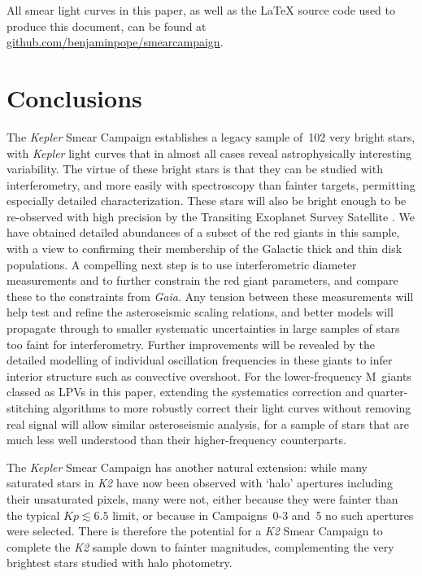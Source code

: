 \documentclass[a4paper,fleqn,usenatbib]{mnras}
\newcommand{\kepler}{\textit{Kepler}\xspace}
\newcommand{\ktwo}{\textit{K2}\xspace}
\newcommand{\gaia}{\textit{Gaia}\xspace}
\begin{document}
All smear light curves in this paper, as well as the \LaTeX{} source code used to produce this document, can be found
at \url{github.com/benjaminpope/smearcampaign}.


\section{Conclusions}
\label{conclusions}

The \kepler Smear Campaign establishes a legacy sample of~102 very bright stars, with \kepler light curves that in almost all cases reveal astrophysically interesting variability. The virtue of these bright stars is that they can be studied with interferometry, and more easily with spectroscopy than fainter targets, permitting especially detailed characterization. These stars will also be bright enough to be re-observed with high precision by the Transiting Exoplanet Survey Satellite \citep[][TESS;]{tess}. We have obtained detailed abundances of a subset of the red giants in this sample, with a view to confirming their membership of the Galactic thick and thin disk populations. A compelling next step is to use interferometric diameter measurements and to further constrain the red giant parameters, and compare these to the constraints from \gaia. Any tension between these measurements will help test and refine the asteroseismic scaling relations, and better models will propagate through to smaller systematic uncertainties in large samples of stars too faint for interferometry. Further improvements will be revealed by the detailed modelling of individual oscillation frequencies in these giants to infer interior structure such as convective overshoot. For the lower-frequency M~giants classed as LPVs in this paper, extending the systematics correction and quarter-stitching algorithms to more robustly correct their light curves without removing real signal will allow similar asteroseismic analysis, for a sample of stars that are much less well understood than their higher-frequency counterparts. 

The \kepler Smear Campaign has another natural extension: while many saturated stars in \ktwo have now been observed with `halo' apertures including their unsaturated pixels, many were not, either because they were fainter than the typical $Kp \lesssim 6.5$ limit, or because in Campaigns~0-3 and~5 no such apertures were selected. There is therefore the potential for a \ktwo Smear Campaign to complete the \ktwo sample down to fainter magnitudes, complementing the very brightest stars studied with halo photometry. 
\end{document}
